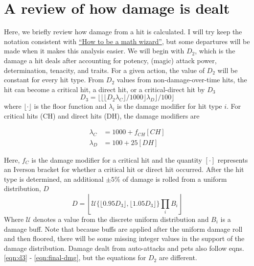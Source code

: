 \documentclass{article}
\begin{document}
    \section{A review of how damage is dealt}
    Here, we briefly review how damage from a hit is calculated. I will try keep the notation consistent with \href{https://docs.google.com/document/d/1OpfKYmf31FpES3IHOrl3H8phU4Np8FChH4B4lP1ZE08/edit#}{``How to be a math wizard''}, but some departures will be made when it makes this analysis easier. We will begin with $D_2$, which is the damage a hit deals after accounting for potency, (magic) attack power, determination, tenacity, and traits. For a given action, the value of $D_2$ will be constant for every hit type. From $D_2$ values from non-damage-over-time hits, the hit can become a critical hit, a direct hit, or a critical-direct hit by $D_3$
    \begin{equation}\label{eqn:d3}
        D_3 = \lfloor \lfloor \lfloor D_2 \lambda_C \rfloor / 1000 \rfloor \lambda_D \rfloor / 100 \rfloor
    \end{equation}
    where $\lfloor \cdot \rfloor$ is the floor function and $\lambda_i$ is the damage modifier for hit type $i$. For critical hits (CH) and direct hits (DH), the damage modifiers are

    \begin{equation}
        \begin{split}
            \lambda_C &= 1000 + f_{CH}[CH] \\
            \lambda_D &= 100 + 25[DH]
        \end{split}
    \end{equation}

    Here, $f_C$ is the damage modifier for a critical hit and the quantity $[\cdot]$ represents an Iverson bracket for whether a critical hit or direct hit occurred. After the hit type is determined, an additional $\pm 5\%$ of damage is rolled from a uniform distribution, $D$
    \begin{equation}\label{eqn:final-dmg}
        D = \left\lfloor \mathcal{U}\{ \lfloor 0.95 D_3 \rfloor, \lfloor 1.05 D_3  \rfloor \} \prod_{i}B_i \right\rfloor
    \end{equation}
    Where $\mathcal{U}$ denotes a value from the discrete uniform distribution and $B_i$ is a damage buff. Note that because buffs are applied after the uniform damage roll and then floored, there will be some missing integer values in the support of the damage distribution. Damage dealt from auto-attacks and pets also follow eqns. \ref{eqn:d3} - \ref{eqn:final-dmg}, but the equations for $D_2$ are different.
    
\end{document}
